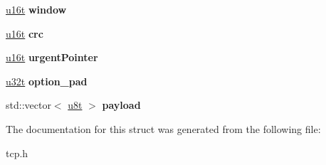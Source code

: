 \begin{DoxyCompactItemize}
\hyperlink{macros_8h_a590a9a8f7df8fabfac6573e21da1922d}{u16t} {\bfseries window}
\item 
\mbox{\label{structtcp__header__t_a77f30d1156bb756a032d22ddf7da68be}} 
\hyperlink{macros_8h_a590a9a8f7df8fabfac6573e21da1922d}{u16t} {\bfseries crc}
\item 
\mbox{\label{structtcp__header__t_a276b80e1695467a2e1e0042e2007bb6e}} 
\hyperlink{macros_8h_a590a9a8f7df8fabfac6573e21da1922d}{u16t} {\bfseries urgent\+Pointer}
\item 
\mbox{\label{structtcp__header__t_aa0942cb51895cd56edbf6e7c38ac001c}} 
\hyperlink{macros_8h_a464a07ed2c6d005d677113cc44750a64}{u32t} {\bfseries option\+\_\+pad}
\item 
\mbox{\label{structtcp__header__t_a21fd2ea47b4350e682d309ce6aa8c311}} 
std\+::vector$<$ \hyperlink{macros_8h_a176a4ab0531a048e0693a4520c550193}{u8t} $>$ {\bfseries payload}
\end{DoxyCompactItemize}


The documentation for this struct was generated from the following file\+:\begin{DoxyCompactItemize}
\item 
tcp.\+h\end{DoxyCompactItemize}
